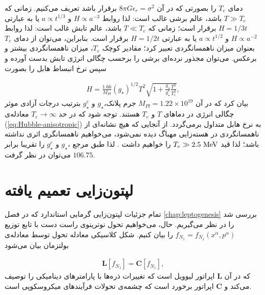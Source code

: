 \documentclass[a4paper]{book}
\begin{document}
دمای {\footnotesize$T_e$} را بصورتی که در آن {\footnotesize$8 \pi G \epsilon_r=\sigma^2$} برقرار باشد تعریف می‌کنیم. زمانی که {\footnotesize$T\gg T_e$} باشد، عالم برشی غالب است: لذا روابط {\footnotesize$H \propto a^{-3}$} و {\footnotesize$a \propto t^{1/3}$} یا به عبارتی {\footnotesize$H = 1/3t$} برقرار است؛ زمانی که {\footnotesize$T \ll T_e$} باشد، عالم تابش غالب است: لذا روابط {\footnotesize$H \propto a^{-2}$} و {\footnotesize$a \propto t^{1/2}$} یا به عبارتی {\footnotesize$H = 1/2t$} برقرار است.
بنابراین، می‌توان از دمای {\footnotesize$T_e$} بعنوان میزان ناهمسانگردی تعبیر کرد؛ مقادیر کوچک {\footnotesize$T_e$}، میزان ناهمسانگردی بیشتر و برعکس.
می‌توان مجذور نرده‌ای برشی را برحسب چگالی انرژی تابش بدست آورده و سپس نرخ انبساط هابل را بصورت \cite{PhysRevD.42.3310}
\par
\vspace{-0.5cm}
{\footnotesize\begin{align}
	H=\frac{1.66}{M_{Pl}} (g_{\star})^{1/2} T^2 \sqrt{1+\frac{g_{\star}}{g^e_{\star}}\frac{T^2}{T^2_e}},
	\label{eq:Hubble-anisotropic}
\end{align}}
بیان کرد که در آن {\footnotesize$M_{Pl} = 1.22 \times 10^{19}$} جرم پلانک،{$g_{\star}$} و {\footnotesize$g_{\star}^e$} بترتیب درجات آزادی موثر چگالی انرژی در دماهای {\footnotesize$T$} و {\footnotesize$T_e$} هستند.
توجه شود که در حد {\footnotesize$T_e \to \infty$} معادله‌ی (\ref{eq:Hubble-anisotropic}) به نرخ هابل متداول برمی‌گردد. از آنجایی که هیچ نشانه‌ای از ناهمسانگردی در هسته‌زایی مهباگ دیده نمی‌شود، می‌خواهیم ناهمسانگری اثری نداشته باشد؛ لذا قید {\footnotesize$T_e\gg 2.5\ \rm MeV$} را خواهیم داشت \cite{PhysRevD.42.3310}. لذا طبق مرجع \cite{Husdal:2016haj} ،{$g_{\star}$} و {\footnotesize$g_{\star}^e$} را تقریبا برابر {\footnotesize$106.75$} می‌توان در نظر گرفت.

\section{لپتون‌زایی تعمیم یافته}
\label{sec:modifeid-leptogenesis-anisotropic}
تمام جزئیات لپتون‌زایی گرمایی استاندارد که در فصل \ref{chap:leptogenesis} بررسی شد را در نظر می‌گیریم.
حال، می‌خواهیم تحول نوترینوی راست دست با تابع توزیع {\footnotesize$f_{N_1}=f_{N_1}(x^{\alpha},p^{\alpha})$} را بیان کنیم. شکل کلاسیکی معادله تحول توسط معادله‌ی بولتزمان بیان می‌شود
\par
\vspace{-0.5cm}
{\footnotesize\begin{align}
	\boldsymbol{L}[f_{N_1}]=\boldsymbol{C}[f_{N_1}]
	\label{eq:Boltzmann-anisotropic},
\end{align}}
که در آن {\footnotesize$\boldsymbol{L}$} اپراتور لیوویل است که تغییرات ذره‌ها با پارامترهای دینامیکی را توصیف می‌کند و {\footnotesize$\boldsymbol{C}$} اپراتور برخورد است که چشمه‌ی تحولات فرآیندهای میکروسکوپی است.
\end{document}
